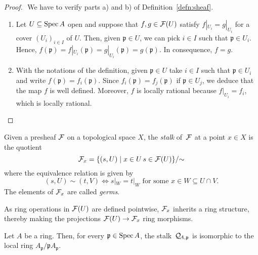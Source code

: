 \begin{proof}${}$ We have to verify parts a) and b) of Definition~\ref{defn:sheaf}.
    \begin{enumerate}[\rm a)]
        \item Let $U\subseteq\operatorname{Spec} A$ open and suppose that $f,g\in\mathcal{F}(U)$ satisfy $f|_{U_i}=g|_{U_i}$ for a cover $(U_i)_{i\in I}$ of $U$. Then, given $\mathfrak p\in U$, we can  pick $i\in I$ such that $\mathfrak p\in U_i$. Hence, $f(\mathfrak p)=f|_{U_i}(\mathfrak p)=g|_{U_i}(\mathfrak p)=g(\mathfrak p)$. In consequence, $f=g$.

        \item With the notations of the definition, given $\mathfrak p\in U$ take $i\in I$ such that $\mathfrak p\in U_i$ and write $f(\mathfrak p)=f_i(\mathfrak p)$. Since $f_i(\mathfrak p)=f_j(\mathfrak p)$ if $\mathfrak p\in U_j$, we deduce that the map $f$ is well defined. Moreover, $f$ is locally rational because $f|_{U_i}=f_i$, which is locally rational.
    \end{enumerate}
\end{proof}

\begin{defn}\label{defn:stalk}
    Given a presheaf $\mathcal{F}$ on a topological space $X$, the \textsl{stalk} of~$\mathcal{F}$ at a point $x\in X$ is the quotient
    $$
        \mathcal{F}_x = \{(s,U)\mid x\in U\,s\in\mathcal{F}(U)\}/{\sim}
    $$
    where the equivalence relation is given by
    $$
        (s,U)\sim(t,V) \iff s|_W = t|_W
            \text{ for some }x\in W\subseteq U\cap V.
    $$
    The elements of $\mathcal{F}_x$ are called \textsl{germs}.
\end{defn}

\begin{rem}
    As ring operations in $\mathcal{F}(U)$ are defined pointwise, $\mathcal{F}_x$ inherits a ring structure, thereby making the projections $\mathcal{F}(U) \to \mathcal{F}_x$ ring morphisms.
\end{rem}

\begin{thm}
    Let\/ $A$ be a ring. Then, for every\/ $\mathfrak p\in\operatorname{Spec} A$, the stalk\/~$\mathcal Q_{\!A,\mathfrak p}$ is isomorphic to the local ring\/ $A_{\mathfrak p}/\mathfrak pA_{\mathfrak p}$.
\end{thm}

